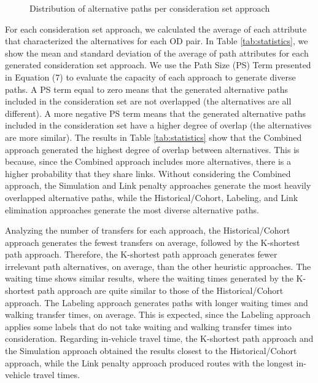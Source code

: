 \documentclass[12pt,a4paper]{article}
\begin{document}
\begin{figure} [H]%
    \caption{Distribution of alternative paths per consideration set approach}
    \label{fig:distribution}
\end{figure}

For each consideration set approach, we calculated the average of each attribute that characterized the alternatives for each OD pair. In Table \ref{tab:statistics}, we show the mean and standard deviation of the average of path attributes for each generated consideration set approach. We use the Path Size (PS) Term presented in Equation (7) to evaluate the capacity of each approach to generate diverse paths. A PS term equal to zero means that the generated alternative paths included in the consideration set are not overlapped (the alternatives are all different). A more negative PS term means that the generated alternative paths included in the consideration set have a higher degree of overlap (the alternatives are more similar). The results in Table \ref{tab:statistics} show that the Combined approach generated the highest degree of overlap between alternatives. This is because, since the Combined approach includes more alternatives, there is a higher probability that they share links. Without considering the Combined approach, the Simulation and Link penalty approaches generate the most heavily overlapped alternative paths, while the Historical/Cohort, Labeling, and Link elimination approaches generate the most diverse alternative paths. 

Analyzing the number of transfers for each approach, the Historical/Cohort approach generates the fewest transfers on average, followed by the K-shortest path approach. Therefore, the K-shortest path approach generates fewer irrelevant path alternatives, on average, than the other heuristic approaches. The waiting time shows similar results, where the waiting times generated by the K-shortest path approach are quite similar to those of the Historical/Cohort approach. The Labeling approach generates paths with longer waiting times and walking transfer times, on average. This is expected, since the Labeling approach applies some labels that do not take waiting and walking transfer times into consideration. Regarding in-vehicle travel time, the K-shortest path approach and the Simulation approach obtained the results closest to the Historical/Cohort approach, while the Link penalty approach produced routes with the longest in-vehicle travel times.
\end{document}
